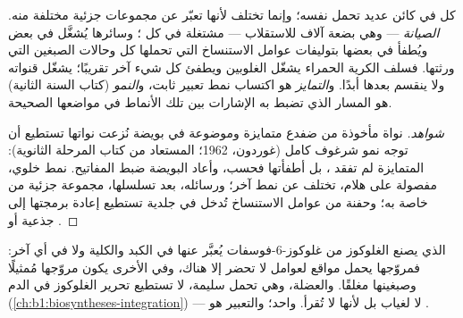 \begin{proposition}\label{prop:b1:expression-control:differentiation}
كل  في كائن عديد  تحمل  نفسه؛ وإنما تختلف
 لأنها تعبّر عن مجموعات جزئية مختلفة منه. 
\emph{الصيانة} --- وهي بضعة آلاف للاستقلاب   --- مشتغلة في كل ؛ وسائرها يُشغَّل في بعض  ويُطفأ
في بعضها بتوليفات عوامل الاستنساخ التي تحملها كل  وحالات
الصبغين التي ورثتها. فسلف الكرية الحمراء يشغّل الغلوبين ويطفئ كل
شيء آخر تقريبًا؛  يشغّل قنواته ولا ينقسم بعدها أبدًا.
و\emph{التمايز} هو اكتساب نمط تعبير ثابت، و\emph{النمو} (كتاب
السنة الثانية) هو المسار الذي تضبط به الإشارات بين  تلك
الأنماط في مواضعها الصحيحة.
\end{proposition}
\begin{proof}[شواهد]
نواة مأخوذة من  ضفدع متمايزة وموضوعة في بويضة نُزعت نواتها
تستطيع أن توجه نمو شرغوف كامل (غوردون، 1962؛ المستعاد من كتاب
المرحلة الثانوية):  المتمايزة لم تفقد ، بل أطفأتها
فحسب، وأعاد  البويضة ضبط المفاتيح.  نمط خلوي،
مفصولة على هلام، تختلف عن  نمط آخر؛ ورسائله، بعد تسلسلها،
مجموعة جزئية من  خاصة به؛ وحفنة من عوامل الاستنساخ تُدخل
في  جلدية تستطيع إعادة برمجتها إلى  جذعية أو .
\end{proof}

\begin{example}\label{ex:b1:expression-control:twoorgans}
  الذي يصنع الغلوكوز من غلوكوز-6-فوسفات يُعبَّر عنها
في الكبد والكلية ولا في أي  آخر: فمروّجها يحمل مواقع لعوامل لا
تحضر إلا هناك، وفي  الأخرى يكون مروّجها مُمثيلًا وصبغينها
مغلقًا. والعضلة، وهي تحمل  سليمة، لا تستطيع تحرير الغلوكوز
في الدم (\cref{ch:b1:biosyntheses-integration}) --- لا لغياب
 بل لأنها لا تُقرأ.  واحد؛ والتعبير هو .
\end{example}

